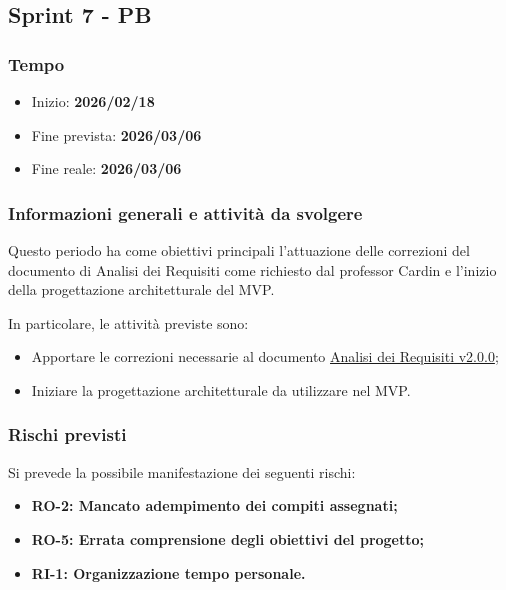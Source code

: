 \documentclass[a4paper,12pt]{article}
\begin{document}
    \subsection{Sprint 7 - PB}{
    \subsubsection{Tempo}{
        \begin{itemize}
            \item[] Inizio: \textbf{2026/02/18} 
            \item[] Fine prevista: \textbf{2026/03/06} 
            \item[] Fine reale: \textbf{2026/03/06} 
        \end{itemize}
    }
    \subsubsection{Informazioni generali e attività da svolgere}{
        Questo periodo ha come obiettivi principali l'attuazione delle correzioni del documento di Analisi dei Requisiti come richiesto dal professor Cardin e l'inizio della progettazione architetturale del MVP.
    }
            
    \noindent In particolare, le attività previste sono:
            \begin{itemize}
                \item Apportare le correzioni necessarie al documento \href{https://atlasteam9.github.io/Atlas/docs/PB/documenti/esterni/Analisi%20dei%20Requisiti.pdf}{Analisi dei Requisiti v2.0.0};
                \item Iniziare la progettazione architetturale da utilizzare nel MVP.
            \end{itemize}
        }
        \subsubsection{Rischi previsti}{
            Si prevede la possibile manifestazione dei seguenti rischi:
            \begin{itemize}
                \item \textbf{RO-2: Mancato adempimento dei compiti assegnati;}
                \item \textbf{RO-5: Errata comprensione degli obiettivi del progetto;}
                \item \textbf{RI-1: Organizzazione tempo personale.}
            \end{itemize}
        }
    
\end{document}
